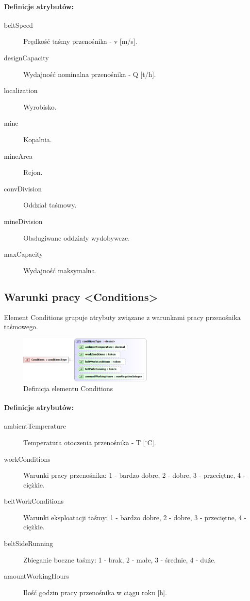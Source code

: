 \documentclass[12pt,a4paper]{article}
\begin{document}
\paragraph{Definicje atrybutów:}
\begin{description}
\item[beltSpeed] Prędkość taśmy przenośnika - v [m/s].
\item[designCapacity] Wydajność nominalna przenośnika - Q [t/h].
\item[localization] Wyrobisko.
\item[mine] Kopalnia.
\item[mineArea] Rejon.
\item[convDivision] Oddział taśmowy.
\item[mineDivision] Obsługiwane oddziały wydobywcze.
\item[maxCapacity] Wydajność maksymalna.
\end{description}

\subsection{Warunki pracy <Conditions>}
Element Conditions grupuje atrybuty związane z warunkami pracy przenośnika
taśmowego.

\begin{figure}[h]
  \centering
  \includegraphics[width=0.6\textwidth]{png/conditions_xsd2}
  \caption{Definicja elementu Conditions}
  \label{fig:conditions-xsd}
\end{figure}

\paragraph{Definicje atrybutów:}
\begin{description}
\item[ambientTemperature] Temperatura otoczenia przenośnika - T [$^\circ$C].
\item[workConditions] Warunki pracy przenośnika: 1 - bardzo dobre, 2 - dobre,
  3 - przeciętne, 4 - ciężkie.
\item[beltWorkConditions] Warunki eksploatacji taśmy: 1 - bardzo dobre,
  2 - dobre, 3 - przeciętne, 4 - ciężkie.
\item[beltSideRunning] Zbieganie boczne taśmy: 1 - brak, 2 - małe, 3 - średnie,
  4 - duże.
\item[amountWorkingHours] Ilość godzin pracy przenośnika w ciągu roku [h].
\end{description}
\end{document}
